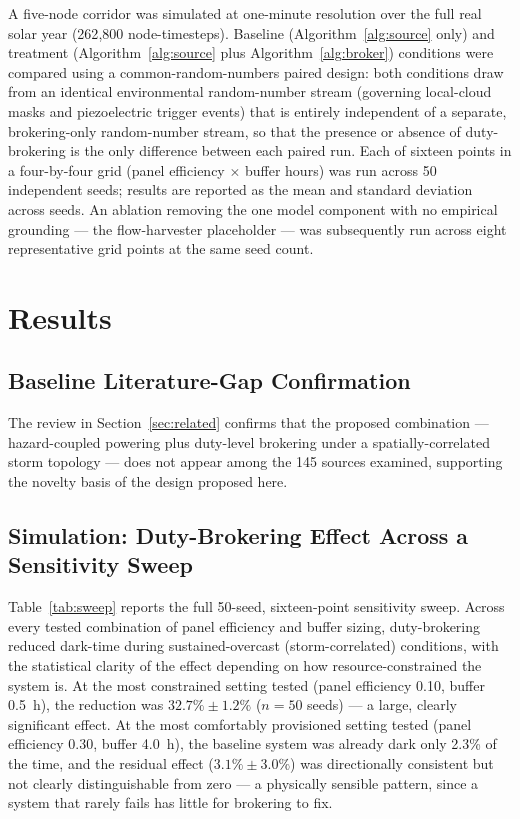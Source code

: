 \documentclass[electronics,article,submit,moreauthors]{Definitions/mdpi}
\begin{document}
A five-node corridor was simulated at one-minute resolution over the full real solar year (262{,}800 node-timesteps). Baseline (Algorithm~\ref{alg:source} only) and treatment (Algorithm~\ref{alg:source} plus Algorithm~\ref{alg:broker}) conditions were compared using a common-random-numbers paired design: both conditions draw from an identical environmental random-number stream (governing local-cloud masks and piezoelectric trigger events) that is entirely independent of a separate, brokering-only random-number stream, so that the presence or absence of duty-brokering is the only difference between each paired run. Each of sixteen points in a four-by-four grid (panel efficiency $\times$ buffer hours) was run across 50 independent seeds; results are reported as the mean and standard deviation across seeds. An ablation removing the one model component with no empirical grounding --- the flow-harvester placeholder --- was subsequently run across eight representative grid points at the same seed count.

\section{Results}
\label{sec:results}

\subsection{Baseline Literature-Gap Confirmation}

The review in Section~\ref{sec:related} confirms that the proposed combination --- hazard-coupled powering plus duty-level brokering under a spatially-correlated storm topology --- does not appear among the 145 sources examined, supporting the novelty basis of the design proposed here.

\subsection{Simulation: Duty-Brokering Effect Across a Sensitivity Sweep}
\label{sec:sweep}

Table~\ref{tab:sweep} reports the full 50-seed, sixteen-point sensitivity sweep. Across every tested combination of panel efficiency and buffer sizing, duty-brokering reduced dark-time during sustained-overcast (storm-correlated) conditions, with the statistical clarity of the effect depending on how resource-constrained the system is. At the most constrained setting tested (panel efficiency 0.10, buffer 0.5~h), the reduction was $32.7\% \pm 1.2\%$ ($n=50$ seeds) --- a large, clearly significant effect. At the most comfortably provisioned setting tested (panel efficiency 0.30, buffer 4.0~h), the baseline system was already dark only 2.3\% of the time, and the residual effect ($3.1\% \pm 3.0\%$) was directionally consistent but not clearly distinguishable from zero --- a physically sensible pattern, since a system that rarely fails has little for brokering to fix.
\end{document}
